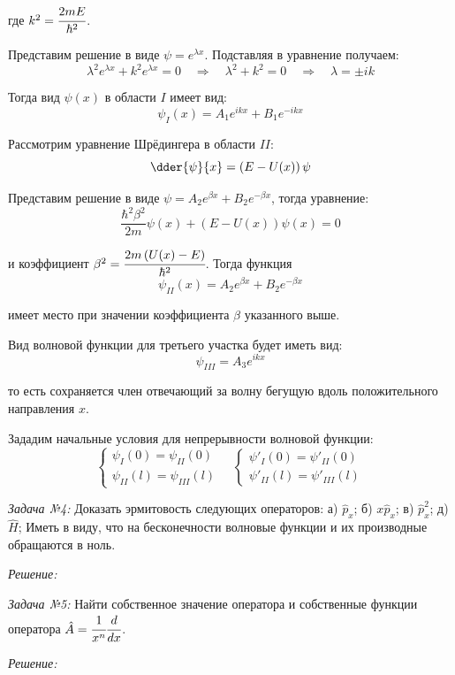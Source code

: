 где \( k^2 = \cfrac{2mE}{\hbar^2} \).

Представим решение в виде \( \psi = e^{\lambda x} \). Подставляя в уравнение 
получаем:
\[ 
	\lambda^2 e^{\lambda x} + k^2 e^{\lambda x} = 0 \quad\Rightarrow\quad
	\lambda^2 + k^2 = 0 \quad\Rightarrow\quad \lambda = \pm ik 
\]

Тогда вид \( \psi(x) \) в области \( I \) имеет вид:
\[
	\psi_{I}(x) = A_1 e^{ikx} + B_1 e^{-ikx}
\]

Рассмотрим уравнение Шрёдингера в области \( II \):
\[
	\dder{\psi}{x} = \left( E - U(x) \right)\psi
\]

Представим решение в виде \( \psi = A_2 e^{\beta x} + B_2 e^{-\beta x} \), 
тогда уравнение:
\[
	\frac{\hbar^2 \beta^2}{2m}\psi(x) + \left( E - U(x) \right)\psi(x) = 0
\]

и коэффициент \( \beta^2 = \cfrac{2m\left( U(x) - E\right)}{\hbar^2} \). 
Тогда функция 
\[
	\psi_{II}(x) = A_2 e^{\beta x} + B_2 e^{-\beta x}
\]

имеет место при значении коэффициента \( \beta \) указанного выше.

Вид волновой функции для третьего участка будет иметь вид:
\[
	\psi_{III} = A_3 e^{ikx}
\]

то есть сохраняется член отвечающий за волну бегущую вдоль
положительного направления \( x \).

Зададим начальные условия для непрерывности волновой функции:
\[
	\left\{ \begin{array}{ll}
		\psi_{I}(0) = \psi_{II}(0) \\
		\psi_{II}(l) = \psi_{III}(l)
	\end{array} \right. \quad
	\left\{ \begin{array}{ll}
		\psi'_{I}(0) = \psi'_{II}(0) \\
		\psi'_{II}(l) = \psi'_{III}(l)
	\end{array} \right.
\]


\pagebreak

\emph{Задача №4:} Доказать эрмитовость следующих операторов: 
а) \( \hat{p}_x \);
б) \( x\hat{p}_x \);
в) \( \hat{p}^2_x \);
д) \( \hat{H} \);
Иметь в виду, что на бесконечности волновые функции и их производные обращаются 
в ноль.

\emph{Решение:}

\pagebreak

\emph{Задача №5:} Найти собственное значение оператора и собственные функции 
оператора \( \hat{A} = \cfrac{1}{x^n}\cfrac{d}{dx} \).

\emph{Решение:}



